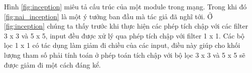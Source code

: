 	
	
	Hình \ref{fig:inception} miêu tả cấu trúc của một module trong mạng. Trong khi đó \ref{fig:nai_inception} là một ý tưởng ban đầu mà tác giả đã nghĩ tới. Ở \ref{fig:inception} chúng ta thấy trước khi thực hiện các phép tích chập với các filter 3 x 3 và 5 x 5, input đều được xử lý qua phép tích chập với filter 1 x 1. Các bộ lọc 1 x 1 có tác dụng làm giảm đi chiều của các input\cite{2}, điều này giúp cho khối lượng tham số phải tính toán ở phép toán tích chập với bộ lọc 3 x 3 và 5 x 5 sẽ được giảm đi một cách đáng kể.
		
	
	
	
	
	
